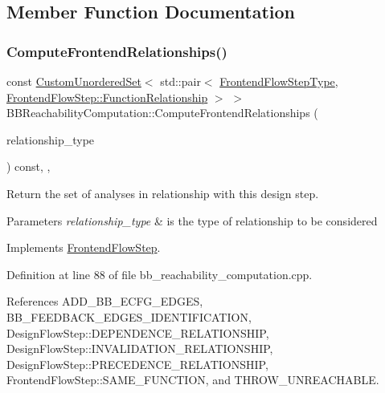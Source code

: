 \subsection{Member Function Documentation}
\mbox{\label{classBBReachabilityComputation_abbfd2e422bc8b4460a89dfe134d800a2}} 
\subsubsection{\texorpdfstring{Compute\+Frontend\+Relationships()}{ComputeFrontendRelationships()}}
{\footnotesize\ttfamily const \hyperlink{classCustomUnorderedSet}{Custom\+Unordered\+Set}$<$ std\+::pair$<$ \hyperlink{frontend__flow__step_8hpp_afeb3716c693d2b2e4ed3e6d04c3b63bb}{Frontend\+Flow\+Step\+Type}, \hyperlink{classFrontendFlowStep_af7cf30f2023e5b99e637dc2058289ab0}{Frontend\+Flow\+Step\+::\+Function\+Relationship} $>$ $>$ B\+B\+Reachability\+Computation\+::\+Compute\+Frontend\+Relationships (\begin{DoxyParamCaption}\item[{const \hyperlink{classDesignFlowStep_a723a3baf19ff2ceb77bc13e099d0b1b7}{Design\+Flow\+Step\+::\+Relationship\+Type}}]{relationship\+\_\+type }\end{DoxyParamCaption}) const\hspace{0.3cm}{\ttfamily [override]}, {\ttfamily [private]}, {\ttfamily [virtual]}}



Return the set of analyses in relationship with this design step. 


\begin{DoxyParams}{Parameters}
{\em relationship\+\_\+type} & is the type of relationship to be considered \\
\hline
\end{DoxyParams}


Implements \hyperlink{classFrontendFlowStep_abeaff70b59734e462d347ed343dd700d}{Frontend\+Flow\+Step}.



Definition at line 88 of file bb\+\_\+reachability\+\_\+computation.\+cpp.



References A\+D\+D\+\_\+\+B\+B\+\_\+\+E\+C\+F\+G\+\_\+\+E\+D\+G\+ES, B\+B\+\_\+\+F\+E\+E\+D\+B\+A\+C\+K\+\_\+\+E\+D\+G\+E\+S\+\_\+\+I\+D\+E\+N\+T\+I\+F\+I\+C\+A\+T\+I\+ON, Design\+Flow\+Step\+::\+D\+E\+P\+E\+N\+D\+E\+N\+C\+E\+\_\+\+R\+E\+L\+A\+T\+I\+O\+N\+S\+H\+IP, Design\+Flow\+Step\+::\+I\+N\+V\+A\+L\+I\+D\+A\+T\+I\+O\+N\+\_\+\+R\+E\+L\+A\+T\+I\+O\+N\+S\+H\+IP, Design\+Flow\+Step\+::\+P\+R\+E\+C\+E\+D\+E\+N\+C\+E\+\_\+\+R\+E\+L\+A\+T\+I\+O\+N\+S\+H\+IP, Frontend\+Flow\+Step\+::\+S\+A\+M\+E\+\_\+\+F\+U\+N\+C\+T\+I\+ON, and T\+H\+R\+O\+W\+\_\+\+U\+N\+R\+E\+A\+C\+H\+A\+B\+LE.

